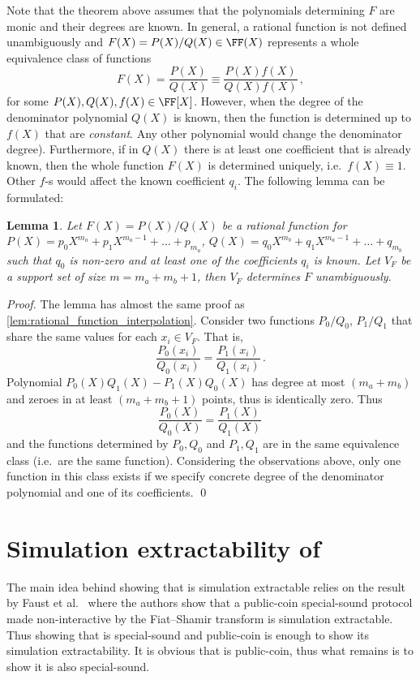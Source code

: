 \documentclass[runningheads,11pt]{llncs}
\newtheorem{lemma}[theorem]{Lemma}
\theoremstyle{definition}
\begin{document}
Note that the theorem above assumes that the polynomials determining $F$ are monic and their degrees are known. In general, a rational function is not defined unambiguously and $F(X) = P(X) / Q(X) \in \FF(X)$ represents a whole equivalence class of functions
\[
	F(X) = \frac{P(X)}{Q(X)} \equiv \frac{P(X) f(X)}{Q(X) f(X)}\,,
\]
for some $P(X), Q(X), f(X) \in \FF[X]$.
However, when the degree of the denominator polynomial $Q(X)$ is known, then the function is determined up to $f(X)$ that are \emph{constant}. Any other polynomial would change the denominator degree).
Furthermore, if in $Q(X)$ there is at least one coefficient that is already known, then the whole function $F(X)$ is determined uniquely, i.e.~$f(X) \equiv 1$. Other $f$-s would affect the known coefficient $q_i$.
The following lemma can be formulated:
\begin{lemma}
	\label{lem:rational_function_interpolation_2}
	Let $F(X) = P(X) / Q(X)$ be a rational function for $P(X) = p_0 X^{m_a} + p_1 X^{m_a - 1} + \ldots + p_{m_a}$, $Q(X) = q_0 X^{m_b} + q_1 X^{m_a - 1} + \ldots + q_{m_b}$ such that $q_0$ is non-zero and at least one of the coefficients $q_i$ is known.
	Let $V_F$ be a support set of size $m = m_a + m_b + 1$, then $V_F$ determines $F$ unambiguously.
\end{lemma}
\begin{proof}
	The lemma has almost the same proof as \cref{lem:rational_function_interpolation}. Consider two functions $P_0 / Q_0$, $P_1 / Q_1$ that share the same values for each $x_i \in V_F$. That is,
	\[
		\frac{P_0(x_i)}{Q_0(x_i)} = \frac{P_1(x_i)}{Q_1(x_i)}\,.
	\]
	Polynomial $P_0(X) Q_1(X) - P_1(X) Q_0(X)$ has degree at most $(m_a + m_b)$ and zeroes in at least $(m_a + m_b + 1)$ points, thus is identically zero. Thus
	\[
		\frac{P_0(X)}{Q_0(X)} = \frac{P_1(X)}{Q_1(X)}\,
	\]
	and the functions determined by $P_0, Q_0$ and $P_1, Q_1$ are in the same equivalence class (i.e.~are the same function). Considering the observations above, only one function in this class exists if we specify concrete degree of the denominator polynomial and one of its coefficients.
	\qed
\end{proof}

\section{Simulation extractability of \plonk [OLD]}
The main idea behind showing that \plonk{} is simulation extractable relies on the result by Faust et al.~\cite{INDOCRYPT:FKMV12} where the authors show that a public-coin special-sound protocol made non-interactive by the Fiat--Shamir transform is simulation extractable.
Thus showing that \plonk{} is special-sound and public-coin is enough to show its simulation extractability. It is obvious that \plonk{} is public-coin, thus what remains is to show it is also special-sound.
\end{document}
